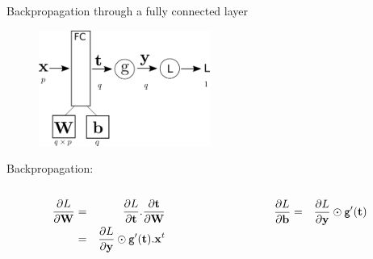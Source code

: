\documentclass[xcolor=pdftex,dvipsnames,table,mathserif]{beamer}
\begin{document}
\begin{frame}{Backpropagation through a fully connected layer}
  \begin{figure}
    \includegraphics[width=0.5\textwidth]{../graphics/bp_fc.png}
  \end{figure}

  Backpropagation:
  \begin{columns}
    \begin{column}{.5\textwidth}
      \begin{eqnarray*}
        \pdv{L}{\mathbf{W}} &=& \pdv{L}{\mathbf{t}}.\pdv{\mathbf{t}}{\mathbf{W}} \\
                   &=& \pdv{L}{\mathbf{y}} \odot \texttt{g}'(\mathbf{t}).\mathbf{x}^t
      \end{eqnarray*}
    \end{column}

  \begin{column}{.5\textwidth}
  \begin{eqnarray*}
    \pdv{L}{\mathbf{b}} &=&  \pdv{L}{\mathbf{y}} \odot \texttt{g}'(\mathbf{t})
  \end{eqnarray*}
  \end{column}
\end{columns}


\end{frame}
\end{document}
